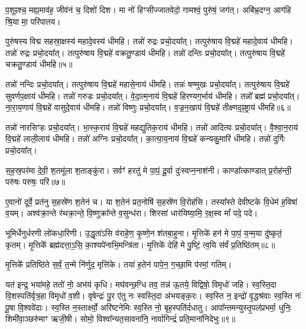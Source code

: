 प॒शूꣴश्च॒ मह्य॒माव॑ह॒ जीव॑नं च॒ दिशो॑ दिश। 
मा नो॑ हिꣳसीज्जातवेदो॒ गामश्वं॒ पुरु॑षं॒ जग॑त्। 
अबि॑भ्र॒दग्न॒ आग॑हि श्रि॒या मा॒ परि॑पातय।


पुरु॑षस्य विद्म सहस्रा॒क्षस्य॑ महादे॒वस्य॑ धीमहि। 
तन्नो॑ रुद्रः प्रचो॒दया᳚त्। 
तत्पुरु॑षाय वि॒द्महे॑ महादे॒वाय॑ धीमहि। 
तन्नो॑ रुद्रः प्रचो॒दया᳚त्। 
तत्पुरु॑षाय वि॒द्महे॑ वक्रतु॒ण्डाय॑ धीमहि। 
तन्नो॑ दन्तिः प्रचो॒दया᳚त्। 
तत्पुरु॑षाय वि॒द्महे॑ चक्रतु॒ण्डाय॑ धीमहि॥५॥

तन्नो॑ नन्दिः प्रचो॒दया᳚त्। 
तत्पुरु॑षाय वि॒द्महे॑ महासे॒नाय॑ धीमहि। 
तन्नः॑ षण्मुखः प्रचो॒दया᳚त्। 
तत्पुरु॑षाय वि॒द्महे॑ सुवर्णप॒क्षाय॑ धीमहि। 
तन्नो॑ गरुडः प्रचो॒दया᳚त्। 
वे॒दा॒त्म॒नाय॑ वि॒द्महे॑ हिरण्यग॒र्भाय॑ धीमहि। 
तन्नो᳚ ब्रह्म॑ प्रचो॒दया᳚त्। 
ना॒रा॒य॒णाय॑ वि॒द्महे॑ वासुदे॒वाय॑ धीमहि। 
तन्नो॑ विष्णुः प्रचो॒दया᳚त्। 
व॒ज्र॒न॒खाय॑ वि॒द्महे॑ तीक्ष्णद॒ꣴ॒ष्ट्राय॑ धीमहि॥६॥

तन्नो॑ नारसिꣳहः प्रचो॒दया᳚त्। 
भा॒स्क॒राय॑ वि॒द्महे॑ महद्युतिक॒राय॑ धीमहि। 
तन्नो॑ आदित्यः प्रचो॒दया᳚त्। 
वै॒श्वा॒न॒राय॑ वि॒द्महे॑ लाली॒लाय॑ धीमहि। 
तन्नो॑ अग्निः प्रचो॒दया᳚त्। 
का॒त्या॒य॒नाय॑ वि॒द्महे॑ कन्यकु॒मारि॑ धीमहि। 
तन्नो॑ दुर्गिः प्रचो॒दया᳚त्। 


स॒ह॒स्र॒पर॑मा दे॒वी॒ श॒तमू॑ला श॒ताङ्कु॑रा। 
सर्वꣳ॑ हरतु॑ मे पा॒पं॒ दू॒र्वा दुः॑स्वप्न॒नाश॑नी। 
काण्डा᳚त्काण्डात् प्र॒रोह॑न्ती॒ परु॑षः परुषः॒ परि॑॥७॥

ए॒वानो॑ दूर्वे॒ प्रत॑नु स॒हस्रे॑ण श॒तेन॑ च। 
या श॒तेन॑ प्रत॒नोषि॑ स॒हस्रे॑ण वि॒रोह॑सि। 
तस्या᳚स्ते देवीष्टके वि॒धेम॑ ह॒विषा॑ व॒यम्। 
अश्व॑क्रा॒न्ते र॑थक्रा॒न्ते॒ वि॒ष्णुक्रा᳚न्ते व॒सुन्ध॑रा। 
शिरसा॑ धार॑यिष्या॒मि॒ र॒क्ष॒स्व मां᳚ पदे॒ पदे।

भूमिर्धेनुर्धरणी लो॑कधा॒रिणी। 
उ॒द्धृता॑ऽसि व॑राहे॒ण॒ कृ॒ष्णे॒न श॑तबा॒हुना। 
मृ॒त्तिके॑ हन॑ मे पा॒पं॒ य॒न्म॒या दु॑ष्कृतं॒ कृतम्। 
मृ॒त्तिके᳚ ब्रह्म॑दत्ता॒ऽ॒सि॒ का॒श्यपे॑नाभि॒मन्त्रि॑ता। 
मृ॒त्तिके॑ देहि॑ मे पु॒ष्टिं॒ त्व॒यि स॑र्वं प्र॒तिष्ठि॑तम्॥८॥

मृ॒त्तिके᳚ प्रतिष्ठि॑ते स॒र्वं॒ त॒न्मे नि॑र्णुद॒ मृत्ति॑के। 
तया॑ ह॒तेन॑ पापे॒न॒ ग॒च्छा॒मि प॑रमां॒ गतिम्।

यत॑ इन्द्र॒ भया॑महे॒ ततो॑ नो॒ अभ॑यं कृधि। 
मघ॑वन्छ॒ग्धि तव॒ तन्न॑ ऊ॒तये॒ विद्विषो॒ विमृधो॑ जहि। 
स्व॒स्ति॒दा वि॒शस्पति॑र्वृत्र॒हा विमृधो॑ व॒शी। 
वृषेन्द्रः॑ पु॒र ए॑तु नः स्वस्ति॒दा अ॑भयङ्क॒रः। 
स्व॒स्ति न॒ इन्द्रो॑ वृ॒द्धश्र॑वाः स्व॒स्ति नः॑ पू॒षा वि॒श्ववे॑दाः। 
स्व॒स्ति न॒स्तार्क्ष्यो॒ अरि॑ष्टनेमिः स्व॒स्ति नो॒ बृह॒स्पति॑र्दधातु। 
आपा᳚न्तमन्युस्तृ॒पल॑प्रभर्मा॒ धुनिः॒ शिमी॑वा॒ञ्छरु॑माꣳ ऋजी॒षी। 
सोमो॒ विश्वा᳚न्यत॒सावना॑नि॒ नार्वागिन्द्रं॑ प्रति॒माना॑निदेभुः॥९॥

